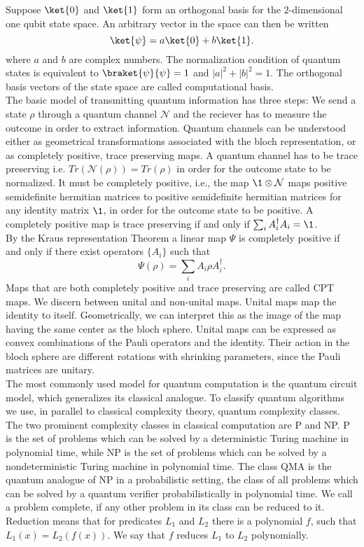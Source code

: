 Suppose $\ket{0}$ and $\ket{1}$ form an orthogonal basis for the $2$-dimensional one qubit state space.
An arbitrary vector in the space can then be written \[
\ket{\psi} = a\ket{0}+b\ket{1}
.\]
where $a$ and $b$ are complex numbers.
The normalization condition of quantum states is equivalent to $\braket{\psi}{\psi}=1$ and $ \left| a \right|^2+\left| b \right|^2=1$.
The orthogonal basis vectors of the state space are called computational basis.\\
The basic model of transmitting quantum information has three steps:
We send a state $\rho$ through a quantum channel $\mathcal{N}$ and the reciever has to measure the outcome in order to extract information.
Quantum channels can be understood either as geometrical transformations associated with the bloch representation, or as completely positive, trace preserving maps.
A quantum channel has to be trace preserving i.e. $Tr(\mathcal{N}(\rho))=Tr(\rho)$ in order for the outcome state to be normalized.
It must be completely positive, i.e., the map $\1\otimes\mathcal{N}$ maps positive semidefinite hermitian matrices to positive semidefinite hermitian matrices for any identity matrix $\1$, in order for the outcome state to be positive.
A completely positive map is trace preserving if and only if $\sum_{i} A_i^{\dagger}A_i = \1$.\\
By the Kraus representation Theorem \cite{choi75} a linear map $\Psi$ is completely positive if and only if there exist operators $ \{A_i\} $ such that \[
\Psi\left(\rho\right)=\sum_{i}A_i\rho A_i^{\dagger}
.\]
Maps that are both completely positive and trace preserving are called CPT maps.
We discern between unital and non-unital maps.
Unital maps map the identity to itself.
Geometrically, we can interpret this as the image of the map having the same center as the bloch sphere.
Unital maps can be expressed as convex combinations of the Pauli operators and the identity.
Their action in the bloch sphere are different rotations with shrinking parameters, since the Pauli matrices are unitary.\cite{imre12}\\
The most commonly used model for quantum computation is the quantum circuit model, which generalizes its classical analogue.
To classify quantum algorithms we use, in parallel to classical complexity theory, quantum complexity classes.
The two prominent complexity classes in classical computation are P and NP.
P is the set of problems which can be solved by a deterministic Turing machine in polynomial time, while NP is the set of problems which can be solved by a nondeterministic Turing machine in polynomial time.
The class QMA is the quantum analogue of NP in a probabilistic setting, the class of all problems which can be solved by a quantum verifier probabilistically in polynomial time.\cite{kempe06}
We call a problem complete, if any other problem in its class can be reduced to it.
Reduction means that for predicates $L_1$ and $L_2$ there is a polynomial $f$, such that $L_1(x)=L_2(f(x))$.
We say that $f$ reduces  $L_1$ to $L_2$ polynomially.\cite{kitaev02}\\

